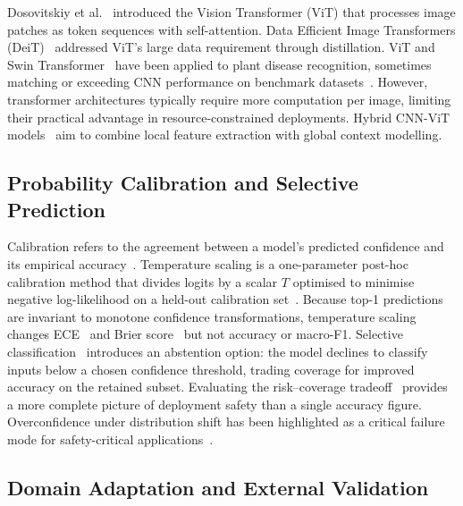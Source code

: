\documentclass[conference]{IEEEtran}
\begin{document}
Dosovitskiy et al.~\cite{dosovitskiy2021image} introduced the Vision Transformer
(ViT) that processes image patches as token sequences with self-attention. Data
Efficient Image Transformers (DeiT)~\cite{touvron2021training} addressed ViT's
large data requirement through distillation. ViT and Swin
Transformer~\cite{liu2021swin} have been applied to plant disease recognition,
sometimes matching or exceeding CNN performance on benchmark
datasets~\cite{chen2022vit,alruwaili2023efficient,yu2023leaf}. However,
transformer architectures typically require more computation per image, limiting
their practical advantage in resource-constrained deployments. Hybrid CNN-ViT
models~\cite{wu2021cvt,chen2021crossvit} aim to combine local feature extraction
with global context modelling.

\subsection{Probability Calibration and Selective Prediction}

Calibration refers to the agreement between a model's predicted confidence and
its empirical accuracy~\cite{guo2017calibration}. Temperature scaling is a
one-parameter post-hoc calibration method that divides logits by a scalar $T$
optimised to minimise negative log-likelihood on a held-out calibration
set~\cite{guo2017calibration,platt1999probabilistic}. Because top-1 predictions
are invariant to monotone confidence transformations, temperature scaling changes
ECE~\cite{naeini2015obtaining} and Brier score~\cite{brier1950verification} but
not accuracy or macro-F1. Selective classification~\cite{geifman2017selective,
el2010foundations,franc2023optimal} introduces an abstention option: the model
declines to classify inputs below a chosen confidence threshold, trading coverage
for improved accuracy on the retained subset. Evaluating the risk--coverage
tradeoff~\cite{geifman2019selectivenet} provides a more complete picture of
deployment safety than a single accuracy figure. Overconfidence under distribution
shift has been highlighted as a critical failure mode for safety-critical
applications~\cite{ovadia2019can,lakshminarayanan2017simple}.

\subsection{Domain Adaptation and External Validation}
\end{document}
